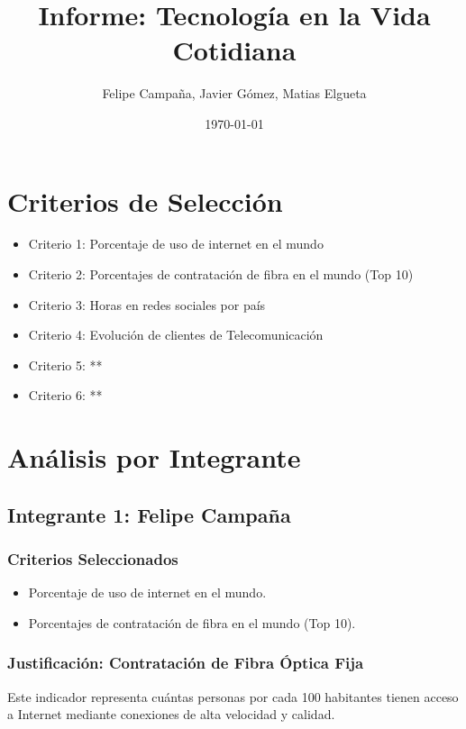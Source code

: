 \documentclass[12pt, a4paper]{article}
\title{Informe: Tecnología en la Vida Cotidiana}
\author{Felipe Campaña, Javier Gómez, Matias Elgueta}
\date{\today\\[2cm]}
\begin{document}
\maketitle

\section*{Criterios de Selección}
\begin{itemize}
    \item Criterio 1: Porcentaje de uso de internet en el mundo
    \item Criterio 2: Porcentajes de contratación de fibra en el mundo (Top 10)
    \item Criterio 3: Horas en redes sociales por país
    \item Criterio 4: Evolución de clientes de Telecomunicación
    \item Criterio 5: **
    \item Criterio 6: **
\end{itemize}

\section*{Análisis por Integrante}

\subsection*{Integrante 1: Felipe Campaña}

\subsubsection*{Criterios Seleccionados}
\begin{itemize}
    \item Porcentaje de uso de internet en el mundo.
    \item Porcentajes de contratación de fibra en el mundo (Top 10).
\end{itemize}

\subsubsection*{Justificación: Contratación de Fibra Óptica Fija}
Este indicador representa cuántas personas por cada 100 habitantes tienen acceso a Internet mediante conexiones de alta velocidad y calidad. 
\end{document}
